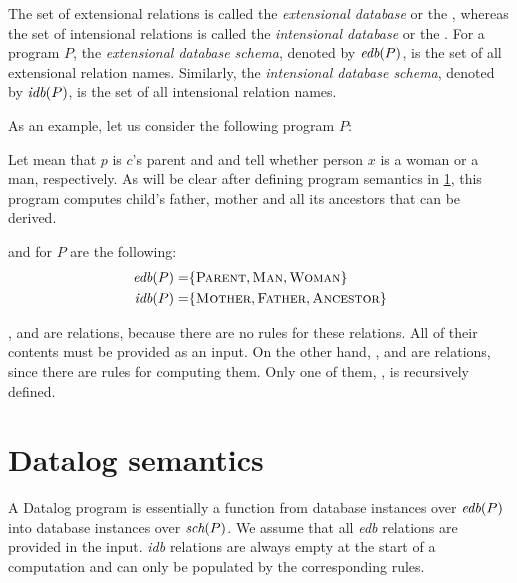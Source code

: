 The set of extensional relations is called the \emph{extensional database} or the \edb, whereas the set of intensional relations is called the \emph{intensional database} or the \idb. For a program $P$, the \emph{extensional database schema}, denoted by $\textit{edb}(P)$, is the set of all extensional relation names. Similarly, the \emph{intensional database schema}, denoted by $\textit{idb}(P)$, is the set of all intensional relation names. 

\begin{exmp}
As an example, let us consider the following program $P$:


Let  mean that $p$ is $c$'s parent and  and  tell whether person $x$ is a woman or a man, respectively. As will be clear after defining program semantics in \ref{ss:datalogsemantics}, this program computes child's father, mother and all its ancestors that can be derived.

\edb and \idb for $P$ are the following:
\begin{align*}
\textit{edb}(P) =& \{\textsc{Parent}, \textsc{Man}, \textsc{Woman}\} \\
\textit{idb}(P) =& \{\textsc{Mother}, \textsc{Father}, \textsc{Ancestor}\}
\end{align*}

,  and  are \edb relations, because there are no rules for these relations. All of their contents must be provided as an input. On the other hand, ,  and  are \idb relations, since there are rules for computing them. Only one of them, , is recursively defined.

\end{exmp}

\section{Datalog semantics}\label{ss:datalogsemantics}
A Datalog program is essentially a function from database instances over $\textit{edb}(P)$ into database instances over $\textit{sch}(P)$. We assume that all \emph{edb} relations are provided in the input. \emph{idb} relations are always empty at the start of a computation and can only be populated by the corresponding rules.


